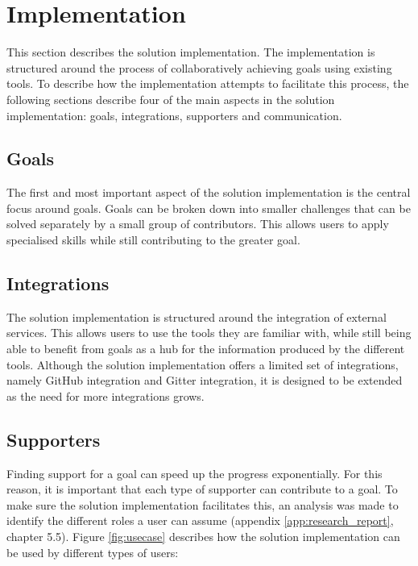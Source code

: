 \section{Implementation}
This section describes the solution implementation. The implementation is structured around the process of collaboratively achieving goals using existing tools. To describe how the implementation attempts to facilitate this process, the following sections describe four of the main aspects in the solution implementation: goals, integrations, supporters and communication.

\subsection{Goals}
The first and most important aspect of the solution implementation is the central focus around goals. Goals can be broken down into smaller challenges that can be solved separately by a small group of contributors. This allows users to apply specialised skills while still contributing to the greater goal.

\subsection{Integrations}
The solution implementation is structured around the integration of external services. This allows users to use the tools they are familiar with, while still being able to benefit from goals as a hub for the information produced by the different tools. Although the solution implementation offers a limited set of integrations, namely GitHub integration and Gitter integration, it is designed to be extended as the need for more integrations grows.

\subsection{Supporters}
Finding support for a goal can speed up the progress exponentially. For this reason, it is important that each type of supporter can contribute to a goal. To make sure the solution implementation facilitates this, an analysis was made to identify the different roles a user can assume (appendix \ref{app:research_report}, chapter 5.5). Figure \ref{fig:usecase} describes how the solution implementation can be used by different types of users:


